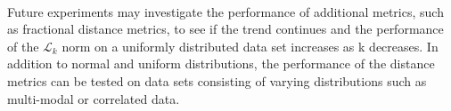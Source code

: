 \documentclass{article}
\begin{document}
\paragraph{}
Future experiments may investigate the performance of additional metrics, such as fractional distance metrics, to see if the trend continues and the performance of the $\mathcal{L}_k$ norm on a uniformly distributed data set increases as k decreases. In addition to normal and uniform distributions, the performance of the distance metrics can be tested on data sets consisting of varying distributions such as multi-modal or correlated data.


\end{document}
